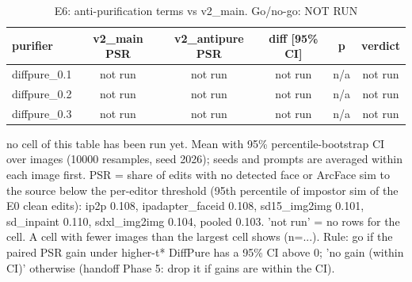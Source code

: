 \begin{table}[t]
\centering
\small
\begin{tabular}{lccccc}
\toprule
purifier & v2\_main PSR & v2\_antipure PSR & diff [95\% CI] & p & verdict \\
\midrule
diffpure\_0.1 & not run & not run & not run & n/a & not run \\
diffpure\_0.2 & not run & not run & not run & n/a & not run \\
diffpure\_0.3 & not run & not run & not run & n/a & not run \\
\bottomrule
\end{tabular}
\caption{E6: anti-purification terms vs v2\_main. Go/no-go: NOT RUN}
\label{tab:e6}
\par\footnotesize no cell of this table has been run yet. Mean with 95\% percentile-bootstrap CI over images (10000 resamples, seed 2026); seeds and prompts are averaged within each image first. PSR = share of edits with no detected face or ArcFace sim to the source below the per-editor threshold (95th percentile of impostor sim of the E0 clean edits): ip2p 0.108, ipadapter\_faceid 0.108, sd15\_img2img 0.101, sd\_inpaint 0.110, sdxl\_img2img 0.104, pooled 0.103. 'not run' = no rows for the cell. A cell with fewer images than the largest cell shows (n=...). Rule: go if the paired PSR gain under higher-t* DiffPure has a 95\% CI above 0; 'no gain (within CI)' otherwise (handoff Phase 5: drop it if gains are within the CI).
\end{table}
